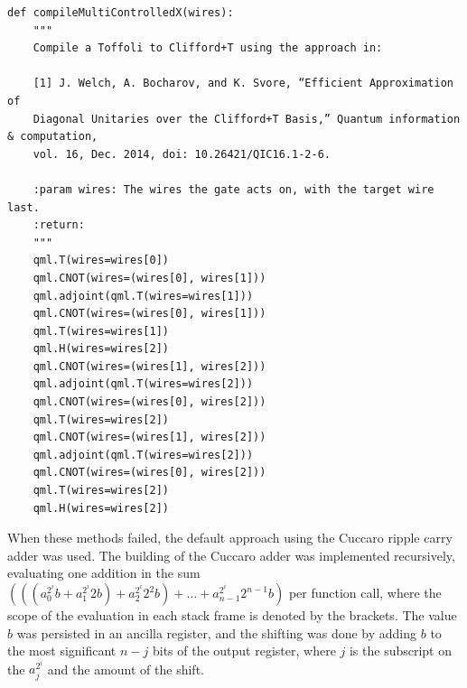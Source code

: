 \documentclass{article}
\begin{document}
\begin{lstlisting}
def compileMultiControlledX(wires):
    """
    Compile a Toffoli to Clifford+T using the approach in:

    [1] J. Welch, A. Bocharov, and K. Svore, “Efficient Approximation of
    Diagonal Unitaries over the Clifford+T Basis,” Quantum information & computation,
    vol. 16, Dec. 2014, doi: 10.26421/QIC16.1-2-6.

    :param wires: The wires the gate acts on, with the target wire last.
    :return:
    """
    qml.T(wires=wires[0])
    qml.CNOT(wires=(wires[0], wires[1]))
    qml.adjoint(qml.T(wires=wires[1]))
    qml.CNOT(wires=(wires[0], wires[1]))
    qml.T(wires=wires[1])
    qml.H(wires=wires[2])
    qml.CNOT(wires=(wires[1], wires[2]))
    qml.adjoint(qml.T(wires=wires[2]))
    qml.CNOT(wires=(wires[0], wires[2]))
    qml.T(wires=wires[2])
    qml.CNOT(wires=(wires[1], wires[2]))
    qml.adjoint(qml.T(wires=wires[2]))
    qml.CNOT(wires=(wires[0], wires[2]))
    qml.T(wires=wires[2])
    qml.H(wires=wires[2])
\end{lstlisting}

When these methods failed, the default approach using the Cuccaro ripple carry adder was used. The building of the Cuccaro adder was implemented recursively, evaluating one addition in the sum $(((a_0^{2^i} b + a_1^{2^i} 2b) + a_2^{2^i} 2^2 b) + \dots + a_{n-1}^{2^i} 2^{n-1} b)$ per function call, where the scope of the evaluation in each stack frame is denoted by the brackets. The value $b$ was persisted in an ancilla register, and the shifting was done by adding $b$ to the most significant $n - j$ bits of the output register, where $j$ is the subscript on the $a_j^{2^i}$ and the amount of the shift. 
\end{document}
